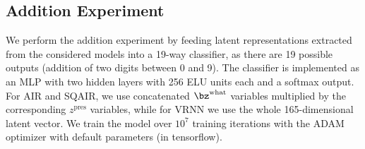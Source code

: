 \subsection{Addition Experiment}

We perform the addition experiment by feeding latent representations extracted from the considered models into a 19-way classifier, as there are 19 possible outputs (addition of two digits between 0 and 9). 
The classifier is implemented as an \gls{MLP} with two hidden layers with 256 \gls{ELU} units each and a softmax output. For \gls{AIR} and \gls{SQAIR}, we use concatenated $\bz^\mathrm{what}$ variables multiplied by the corresponding $z^\mathrm{pres}$ variables, while for \gls{VRNN} we use the whole 165-dimensional latent vector.
We train the model over $10^7$ training iterations with the \gls{ADAM} optimizer \citep{kingma2015adam} with default parameters (in tensorflow).